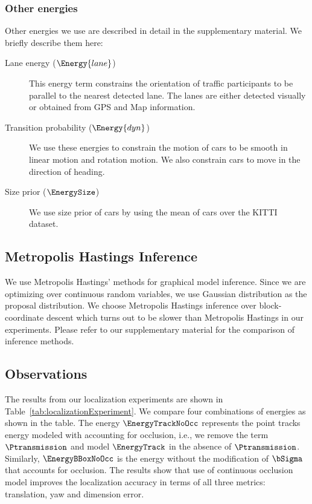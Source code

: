 \subsubsection{Other energies}
Other energies we use are described in detail in the supplementary material. We briefly describe them here:
\begin{description}
  \item[Lane energy ($\Energy{lane}$)] This energy term constrains the
    orientation of traffic participants to be parallel to the nearest detected
    lane. The lanes are either detected visually or obtained from GPS and Map 
    information.
  \item[Transition probability ($\Energy{dyn}$)] We use these energies to
    constrain the motion of cars to be smooth in linear motion and rotation
    motion. We also constrain cars to move in the direction of heading.
  \item[Size prior ($\EnergySize$)] We use size prior of cars by using the mean
    of cars over the KITTI dataset.
\end{description}

\subsection{Metropolis Hastings Inference}
We use Metropolis Hastings' methods for graphical model inference. Since we are
optimizing over continuous random variables, we use Gaussian distribution as
the proposal distribution. We choose Metropolis Hastings inference over
block-coordinate descent which turns out to be slower than Metropolis Hastings
in our experiments. Please refer to our supplementary material for the comparison
of inference methods.

\subsection{Observations}
The results from our localization experiments are shown in Table~\ref{tab:localizationExperiment}. We compare four combinations of energies as shown in the table.
The energy $\EnergyTrackNoOcc$ represents the point tracks energy modeled with 
accounting for occlusion, i.e., we remove the term $\Ptransmission$ and model
$\EnergyTrack$ in the absence of $\Ptransmission$. Similarly, $\EnergyBBoxNoOcc$ is the energy without the modification of $\bSigma$ that accounts for occlusion.
The results show that use of continuous occlusion model 
improves the localization accuracy in terms of all three metrics: translation,
yaw and dimension error.

